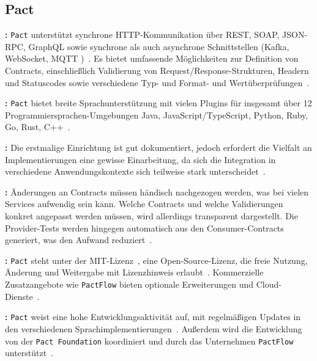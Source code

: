 \subsection*{Pact}

\textbf{:} \texttt{Pact} unterstützt synchrone \gls{HTTP}-Kommunikation über \gls{REST}, \gls{SOAP}, \gls{JSON}-\gls{RPC}, \gls{GraphQL} sowie synchrone als auch asynchrone Schnittstellen (\zB\gls{Kafka}, \gls{WebSocket}, \gls{MQTT} \usw)~\cite{pactfoundationPactDocs2022}.
Es bietet umfassende Möglichkeiten zur Definition von Contracts, einschließlich Validierung von Request/Response-Strukturen, Headern und Statuscodes sowie verschiedene Typ- und Format- und Wertüberprüfungen~\cite{pactfoundationPactDocs2022}.

\textbf{:} \texttt{Pact} bietet breite Sprachunterstützung mit vielen Plugins für insgesamt über 12 Programmiersprachen-Umgebungen \ua Java, JavaScript/TypeScript, Python, Ruby, Go, Rust, C++~\cite{PactFoundation}.

\textbf{:} Die erstmalige Einrichtung ist gut dokumentiert, jedoch erfordert die Vielfalt an Implementierungen eine gewisse Einarbeitung, da sich die Integration in verschiedene Anwendungskontexte sich teilweise stark unterscheidet~\cite{pactfoundationPactDocs2022}.

\textbf{:} Änderungen an Contracts müssen händisch nachgezogen werden, was bei vielen Services aufwendig sein kann.
Welche Contracts und welche Validierungen konkret angepasst werden müssen, wird allerdings transparent dargestellt.
Die Provider-Tests werden hingegen automatisch aus den Consumer-Contracts generiert, was den Aufwand reduziert~\cite{pactfoundationPactDocs2022}.

\textbf{:} \texttt{Pact} steht unter der \gls{MIT}-Lizenz~\cite{PactFoundation}, eine Open-Source-Lizenz, die freie Nutzung, Änderung und Weitergabe mit Lizenzhinweis erlaubt~\cite{MITLicense}.
Kommerzielle Zusatzangebote wie \texttt{PactFlow} bieten optionale Erweiterungen und Cloud-Dienste~\cite{PactflowContractTesting}.

\textbf{:} \texttt{Pact} weist eine hohe Entwicklungsaktivität auf, mit regelmäßigen Updates in den verschiedenen Sprachimplementierungen~\cite{PactFoundation}.
Außerdem wird die Entwicklung von der \texttt{Pact Foundation} koordiniert und durch das Unternehmen \texttt{PactFlow} unterstützt~\cite{PactflowContractTesting}.

